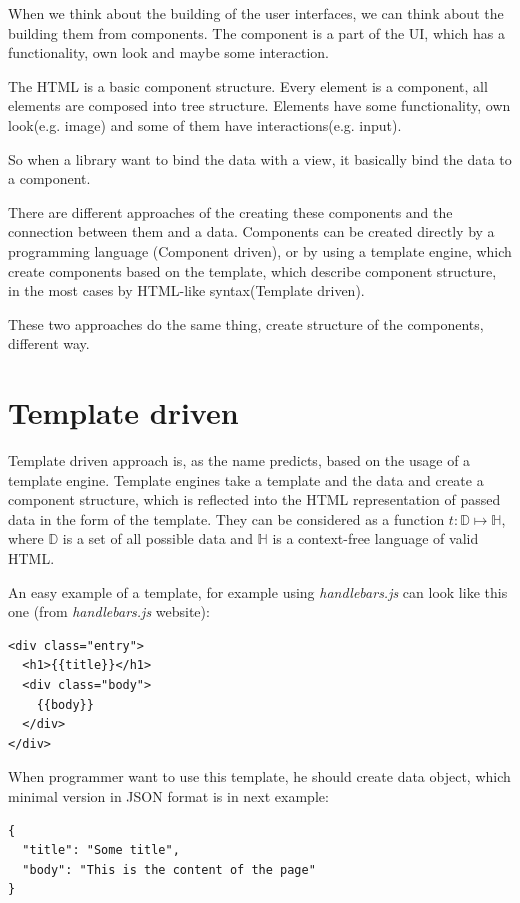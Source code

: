 \documentclass[oneside, 12pt]{book}
\begin{document}
When we think about the building of the user interfaces, we can think about the building them from components.
The component is a part of the UI, which has a functionality, own look and maybe some interaction.

The HTML is a basic component structure. Every element is a component, all elements are composed into tree structure. 
Elements have some functionality, own look(e.g. image) and some of them have interactions(e.g. input).

So when a library want to bind the data with a view, it basically bind the data to a component.

There are different approaches of the creating these components and the connection between them and a data. 
Components can be created directly by a programming language (Component driven), 
or by using a template engine, which create components based on the template, 
which describe component structure, in the most cases by HTML-like syntax(Template driven).

These two approaches do the same thing, create structure of the components, different way.

\section{Template driven}\label{sec:existing-template}

  Template driven approach is, as the name predicts, based on the usage of a template engine. 
  Template engines take a template and the data and create a component structure, 
  which is reflected into the HTML representation of passed data in the form of the template. 
  They can be considered as a function $t:\mathbb D\mapsto\mathbb H$, 
  where $\mathbb D$ is a set of all possible data and $\mathbb H$ is a context-free language of valid HTML.

  An easy example of a template, for example using \textit{handlebars.js} can look like this one (from \textit{handlebars.js} website):
\begin{verbatim}
<div class="entry">
  <h1>{{title}}</h1>
  <div class="body">
    {{body}}
  </div>
</div>
\end{verbatim}



  When programmer want to use this template, he should create data object, which minimal version in JSON format is in next example:
\begin{verbatim}
{
  "title": "Some title",
  "body": "This is the content of the page"
}
\end{verbatim}
\end{document}
